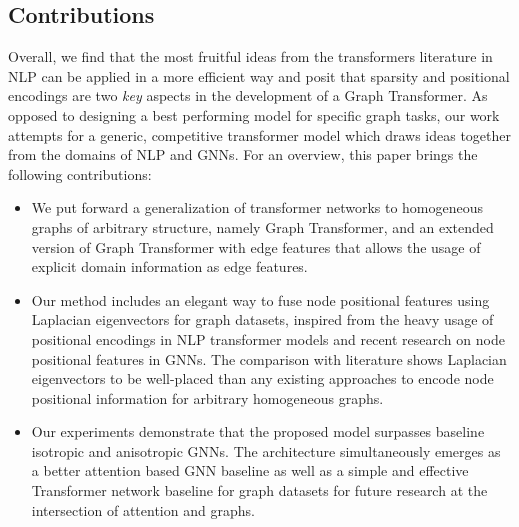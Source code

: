 \documentclass[letterpaper]{article} %
\begin{document}
\subsection{Contributions}
Overall, we find that the most fruitful ideas from the transformers literature in NLP can be applied in a more efficient way and posit that sparsity and positional encodings are two \textit{key} aspects in the development of a Graph Transformer. 
As opposed to designing a best performing model for specific graph tasks, our work attempts for a generic, competitive transformer model which draws ideas together from the domains of NLP and GNNs.
For an overview, this paper brings the following contributions:
\begin{itemize}
    \item We put forward a generalization of transformer networks to homogeneous graphs of arbitrary structure, namely Graph Transformer, and an extended version of Graph Transformer with edge features that allows the usage of explicit domain information as edge features. 
    \item Our method includes an elegant way to fuse node positional features using Laplacian eigenvectors for graph datasets, inspired from the heavy usage of positional encodings in NLP transformer models and recent research on node positional features in GNNs.
    The comparison with literature shows Laplacian eigenvectors to be well-placed than any existing approaches to encode node positional information for arbitrary homogeneous graphs.
    \item Our experiments demonstrate that the proposed model surpasses baseline isotropic and anisotropic GNNs. The architecture simultaneously emerges as a better attention based GNN baseline as well as a simple and effective Transformer network baseline for graph datasets for future research at the intersection of attention and graphs.
\end{itemize}





\end{document}
